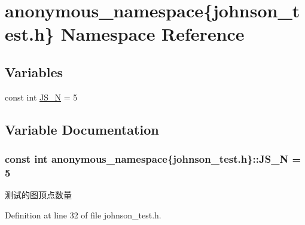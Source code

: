 \hypertarget{namespaceanonymous__namespace_02johnson__test_8h_03}{}\section{anonymous\+\_\+namespace\{johnson\+\_\+test.\+h\} Namespace Reference}
\label{namespaceanonymous__namespace_02johnson__test_8h_03}
\subsection*{Variables}
\begin{DoxyCompactItemize}
\item 
const int \hyperlink{namespaceanonymous__namespace_02johnson__test_8h_03_af983544471b3fa0fe87629414331424d}{J\+S\+\_\+\+N} = 5
\end{DoxyCompactItemize}


\subsection{Variable Documentation}
\hypertarget{namespaceanonymous__namespace_02johnson__test_8h_03_af983544471b3fa0fe87629414331424d}{}
\subsubsection[{J\+S\+\_\+\+N}]{\setlength{\rightskip}{0pt plus 5cm}const int anonymous\+\_\+namespace\{johnson\+\_\+test.\+h\}\+::J\+S\+\_\+\+N = 5}\label{namespaceanonymous__namespace_02johnson__test_8h_03_af983544471b3fa0fe87629414331424d}
测试的图顶点数量 

Definition at line 32 of file johnson\+\_\+test.\+h.

